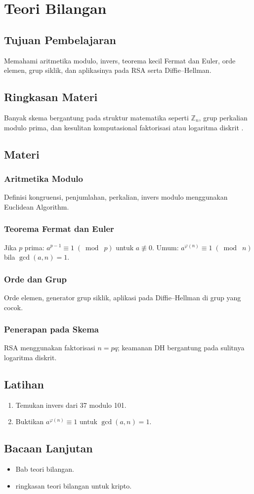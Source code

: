 \documentclass[../main.tex]{subfiles}
\begin{document}
\chapter{Teori Bilangan}
\section{Tujuan Pembelajaran}
Memahami aritmetika modulo, invers, teorema kecil Fermat dan Euler, orde elemen, grup siklik, dan aplikasinya pada RSA serta Diffie--Hellman.

\section{Ringkasan Materi}
Banyak skema bergantung pada struktur matematika seperti \(\mathbb{Z}_n\), grup perkalian modulo prima, dan kesulitan komputasional faktorisasi atau logaritma diskrit \citep{hac,bonehshoup}.

\section{Materi}
\subsection{Aritmetika Modulo}
Definisi kongruensi, penjumlahan, perkalian, invers modulo menggunakan Euclidean Algorithm.

\subsection{Teorema Fermat dan Euler}
Jika \(p\) prima: \(a^{p-1}\equiv 1\; (\bmod\; p)\) untuk \(a\not\equiv 0\). Umum: \(a^{\varphi(n)}\equiv 1\; (\bmod\; n)\) bila \(\gcd(a,n)=1\).

\subsection{Orde dan Grup}
Orde elemen, generator grup siklik, aplikasi pada Diffie--Hellman di grup yang cocok.

\subsection{Penerapan pada Skema}
RSA menggunakan faktorisasi \(n=pq\); keamanan DH bergantung pada sulitnya logaritma diskrit.

\section{Latihan}
\begin{enumerate}
  \item Temukan invers dari 37 modulo 101.
  \item Buktikan \(a^{\varphi(n)}\equiv 1\) untuk \(\gcd(a,n)=1\).
\end{enumerate}

\section{Bacaan Lanjutan}
\begin{itemize}
  \item \citep{hac} Bab teori bilangan.
  \item \citep{bonehshoup} ringkasan teori bilangan untuk kripto.
\end{itemize}
\end{document}
